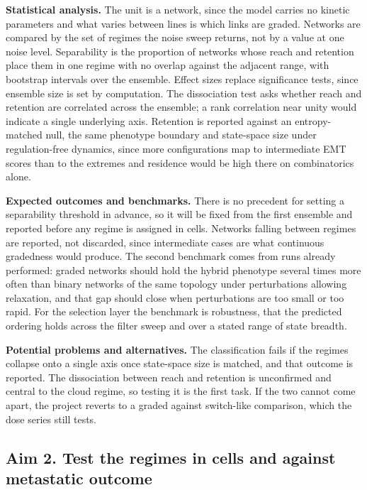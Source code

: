 \documentclass[12pt,letterpaper]{article}
\newcommand{\chg}[1]{\textcolor{chgcolor}{#1}}
\newcommand{\chg}[1]{#1}
\newcommand{\lead}[1]{\textbf{#1}}
\begin{document}
\lead{Statistical analysis.} The unit is a network, since the model carries no kinetic parameters and what varies between lines is which links are graded. Networks are compared by the set of regimes the noise sweep returns, not by a value at one noise level. Separability is the proportion of networks whose reach and retention place them in one regime with no overlap against the adjacent range, with bootstrap intervals over the ensemble. Effect sizes replace significance tests, since ensemble size is set by computation. The dissociation test asks whether reach and retention are correlated across the ensemble; a rank correlation near unity would indicate a single underlying axis. \chg{Retention is reported against an entropy-matched null, the same phenotype boundary and state-space size under regulation-free dynamics, since more configurations map to intermediate EMT scores than to the extremes and residence would be high there on combinatorics alone.}

\lead{Expected outcomes and benchmarks.} There is no precedent for setting a separability threshold in advance, so it will be fixed from the first ensemble and reported before any regime is assigned in cells. Networks falling between regimes are reported, not discarded, since intermediate cases are what continuous gradedness would produce. The second benchmark comes from runs already performed: graded networks should hold the hybrid phenotype several times more often than binary networks of the same topology under perturbations allowing relaxation, and that gap should close when perturbations are too small or too rapid. For the selection layer the benchmark is robustness, that the predicted ordering holds across the filter sweep\chg{ and over a stated range of state breadth}.

\lead{Potential problems and alternatives.} The classification fails if the regimes collapse onto a single axis once state-space size is matched, and that outcome is reported. The dissociation between reach and retention is unconfirmed and central to the cloud regime, so testing it is the first task. If the two cannot come apart, the project reverts to a graded against switch-like comparison, which the dose series still tests.

\subsection{Aim 2. Test the regimes in cells and against metastatic outcome}
\end{document}
